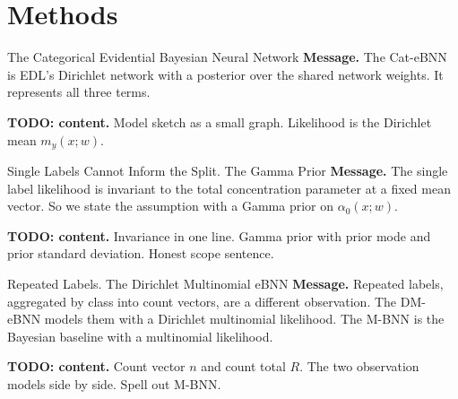 
\section{Methods}

\begin{frame}{The Categorical Evidential Bayesian Neural Network}
	\textbf{Message.} The Cat-eBNN is EDL's Dirichlet network with a posterior over the shared network weights. It represents all three terms.

	\medskip
	\textbf{TODO: content.} Model sketch as a small graph. Likelihood is the Dirichlet mean $m_y(x;w)$.
\end{frame}

\begin{frame}{Single Labels Cannot Inform the Split. The Gamma Prior}
	\textbf{Message.} The single label likelihood is invariant to the total concentration parameter at a fixed mean vector. So we state the assumption with a Gamma prior on $\alpha_0(x;w)$.

	\medskip
	\textbf{TODO: content.} Invariance in one line. Gamma prior with prior mode and prior standard deviation. Honest scope sentence.
\end{frame}

\begin{frame}{Repeated Labels. The Dirichlet Multinomial eBNN}
	\textbf{Message.} Repeated labels, aggregated by class into count vectors, are a different observation. The DM-eBNN models them with a Dirichlet multinomial likelihood. The M-BNN is the Bayesian baseline with a multinomial likelihood.

	\medskip
	\textbf{TODO: content.} Count vector $n$ and count total $R$. The two observation models side by side. Spell out M-BNN.
\end{frame}


